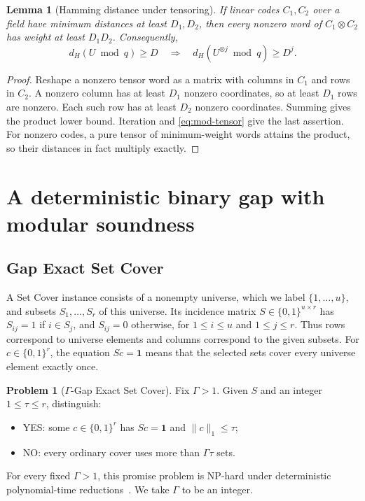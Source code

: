 \documentclass[11pt,letterpaper]{article}
\numberwithin{equation}{section}
\newtheorem{lemma}[theorem]{Lemma}
\theoremstyle{definition}
\newtheorem{problem}[theorem]{Problem}
\theoremstyle{remark}
\begin{document}
\begin{lemma}[Hamming distance under tensoring]\label{lem:hamming}
If linear codes $C_1,C_2$ over a field have minimum distances at least $D_1,D_2$, then every nonzero word of $C_1\otimes C_2$ has weight at least $D_1D_2$. Consequently,
\[
 d_H(U\bmod q)\ge D
 \quad\Longrightarrow\quad
 d_H(U^{\otimes j}\bmod q)\ge D^j.
\]
\end{lemma}
\begin{proof}
Reshape a nonzero tensor word as a matrix with columns in $C_1$ and rows in $C_2$. A nonzero column has at least $D_1$ nonzero coordinates, so at least $D_1$ rows are nonzero. Each such row has at least $D_2$ nonzero coordinates. Summing gives the product lower bound. Iteration and \eqref{eq:mod-tensor} give the last assertion. For nonzero codes, a pure tensor of minimum-weight words attains the product, so their distances in fact multiply exactly.
\end{proof}

\section{A deterministic binary gap with modular soundness}\label{sec:base}
\subsection{Gap Exact Set Cover}
A Set Cover instance consists of a nonempty universe, which we label $\{1,\ldots,u\}$, and subsets $S_1,\ldots,S_r$ of this universe. Its incidence matrix $S\in\{0,1\}^{u\times r}$ has $S_{ij}=1$ if $i\in S_j$, and $S_{ij}=0$ otherwise, for $1\le i\le u$ and $1\le j\le r$. Thus rows correspond to universe elements and columns correspond to the given subsets. For $c\in\{0,1\}^r$, the equation $Sc=\mathbf1$ means that the selected sets cover every universe element exactly once.

\begin{problem}[$\Gamma$-Gap Exact Set Cover]\label{prob:cover}
Fix $\Gamma>1$. Given $S$ and an integer $1\le\tau\le r$, distinguish:
\begin{itemize}
\item YES: some $c\in\{0,1\}^r$ has $Sc=\mathbf1$ and $\|c\|_1\le\tau$;
\item NO: every ordinary cover uses more than $\Gamma\tau$ sets.
\end{itemize}
\end{problem}
For every fixed $\Gamma>1$, this promise problem is NP-hard under deterministic polynomial-time reductions~\cite[Definition 2.5 and Theorem 2.6]{mic12}. We take $\Gamma$ to be an integer.
\end{document}

